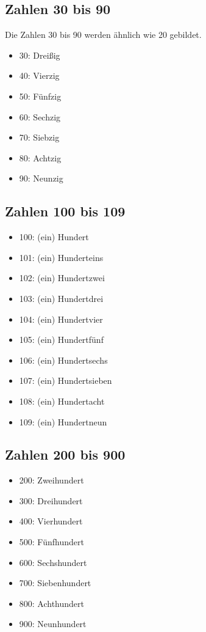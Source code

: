 \documentclass[a4paper]{article}
\begin{document}
\subsection{Zahlen 30 bis 90}
Die Zahlen 30 bis 90 werden \"ahnlich wie 20 gebildet.
\begin{itemize}[nosep]
	\item 30: Drei{\ss}ig
	\item 40: Vierzig
	\item 50: F\"unfzig
	\item 60: Sechzig
	\item 70: Siebzig
	\item 80: Achtzig
	\item 90: Neunzig
\end{itemize}

\subsection{Zahlen 100 bis 109}
\begin{itemize}[nosep]
	\item 100: (ein) Hundert
	\item 101: (ein) Hunderteins
	\item 102: (ein) Hundertzwei
	\item 103: (ein) Hundertdrei
	\item 104: (ein) Hundertvier
	\item 105: (ein) Hundertf\"unf
	\item 106: (ein) Hundertsechs
	\item 107: (ein) Hundertsieben
	\item 108: (ein) Hundertacht
	\item 109: (ein) Hundertneun
\end{itemize}

\subsection{Zahlen 200 bis 900}
\begin{itemize}[nosep]
	\item 200: Zweihundert
	\item 300: Dreihundert
	\item 400: Vierhundert
	\item 500: F\"unfhundert
	\item 600: Sechshundert
	\item 700: Siebenhundert
	\item 800: Achthundert
	\item 900: Neunhundert
\end{itemize}
\end{document}
